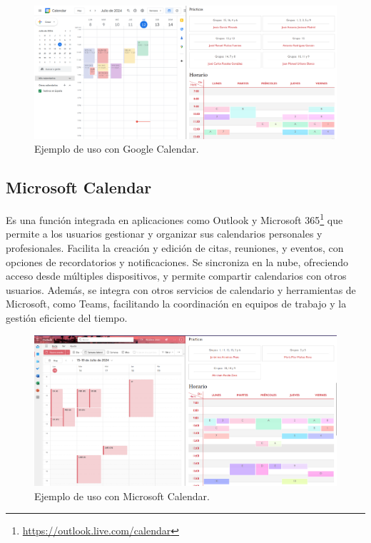 \begin{landscape}

\begin{figure}[H]
    \centering
    \includegraphics[width=1.5\textwidth, angle=0]{./imagenes/Google_Calendar.png}
    \caption{Ejemplo de uso con Google Calendar.}
\end{figure}

\end{landscape}


\subsection{Microsoft Calendar}
Es una función integrada en aplicaciones como Outlook y Microsoft 365\footnote{\url{https://outlook.live.com/calendar}} que permite a los usuarios gestionar y organizar sus calendarios personales y profesionales. Facilita la creación y edición de citas, reuniones, y eventos, con opciones de recordatorios y notificaciones. Se sincroniza en la nube, ofreciendo acceso desde múltiples dispositivos, y permite compartir calendarios con otros usuarios. Además, se integra con otros servicios de calendario y herramientas de Microsoft, como Teams, facilitando la coordinación en equipos de trabajo y la gestión eficiente del tiempo.

\newpage

\begin{landscape}
\begin{figure}[H]
    \centering
    \includegraphics[width=1.5\textwidth, angle=0]{./imagenes/Microsoft_calendar.png}
    \caption{Ejemplo de uso con Microsoft Calendar.}
\end{figure}
\end{landscape}


